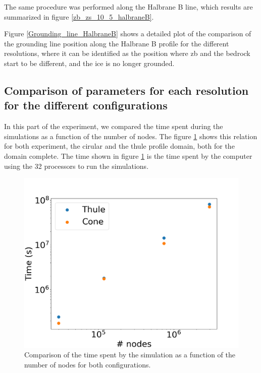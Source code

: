 \documentclass{article}
\begin{document}
The same procedure was performed along the Halbrane B line, which results are summarized in figure \ref{zb_zs_10_5_halbraneB}. 

Figure \ref{Grounding_line_HalbraneB} shows a detailed plot of the comparison of the grounding line position along the Halbrane B profile for the different resolutions, where it can be identified as the position where zb and the bedrock start to be different, and the ice is no longer grounded. 


\subsection{Comparison of parameters for each resolution for the different configurations}
In this part of the experiment, we compared the time spent during the simulations as a function of the number of nodes. The figure \ref{TimeVsNumberofnodes} shows this relation for both experiment, the cirular and the thule profile domain, both for the domain complete. 
The time shown in figure \ref{TimeVsNumberofnodes} is the time spent by the computer using the 32 processors to run the simulations.

	\begin{figure}[!h]
	\centering
	\includegraphics[width=0.9\linewidth]{../fig/TimeVsNumberOfNodes.png}
	\caption{Comparison of the time spent by the simulation as a function of the number of nodes for both configurations.}
	\label{TimeVsNumberofnodes}
	\end{figure}
\end{document}
